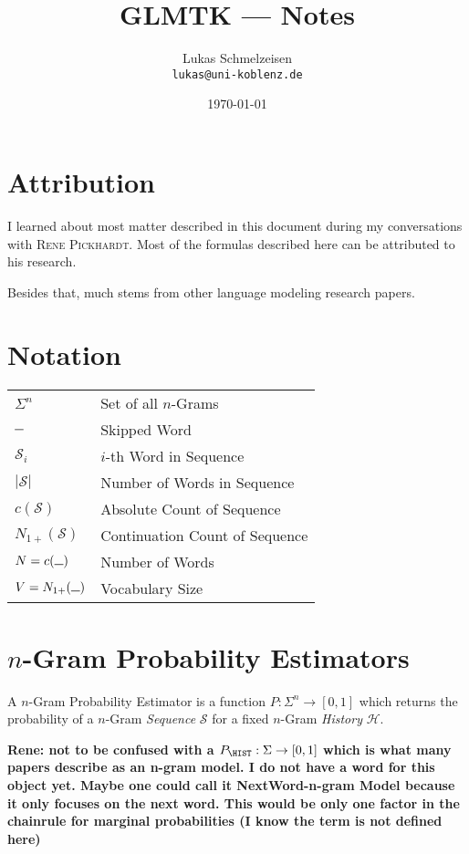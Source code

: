 \documentclass[11pt,a4paper]{article}
\title{GLMTK --- Notes}
\author{Lukas Schmelzeisen \\ \texttt{lukas@uni-koblenz.de}}
\date{\today}
\newcommand{\Seq}{\mathcal{S}}
\newcommand{\Hist}{\mathcal{H}}
\newcommand{\Skp}{\rule{7pt}{.5pt}}
\newcommand{\rp}[1]{\textbf{Rene: #1}}
\begin{document}
  \maketitle
  \tableofcontents
  \clearpage

  \section{Attribution}

  I learned about most matter described in this document during my
  conversations with \textsc{Rene Pickhardt}. Most of the formulas described
  here can be attributed to his research.

  Besides that, much stems from other language modeling research papers.

  \section{Notation}

  \begin{tabular}{ l l }
    $\Sigma^n$  & Set of all $n$-Grams \\
    $\Skp$ & Skipped Word \\
    $\Seq_i$ & $i$-th Word in Sequence \\
    $|\Seq|$ & Number of Words in Sequence \\
    $c(\Seq)$ & Absolute Count of Sequence \\
    $N_{1+}(\Seq)$ & Continuation Count of Sequence \\
    $N = c(\Skp)$ & Number of Words \\
    $V = N_{1+}(\Skp)$ & Vocabulary Size \\
  \end{tabular}

  \section{$n$-Gram Probability Estimators}

  A $n$-Gram Probability Estimator is a function $P :\Sigma^n \to [0,1]$ which
  returns the probability of a $n$-Gram \emph{Sequence} $\Seq$ for a fixed
  $n$-Gram \emph{History} $\Hist$.

\rp{not to be confused with a $P_\HIST:\Sigma \to [0,1]$ which is what many papers describe as an n-gram model. I do not have a word for this object yet. Maybe one could call it NextWord-n-gram Model because it only focuses on the next word. This would be only one factor in the chainrule for marginal probabilities (I know the term is not defined here)}
\end{document}
